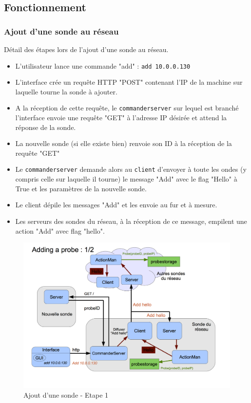 \documentclass[a4paper,11pt]{article}
\begin{document}
\FloatBarrier


\subsection{Fonctionnement}

\subsubsection{Ajout d'une sonde au réseau}

Détail des étapes lors de l'ajout d'une sonde au réseau.
\begin{itemize}
\item L'utilisateur lance une commande "add" : \texttt{add 10.0.0.130}
\item L'interface crée un requête HTTP "POST" contenant l'IP de la machine sur laquelle tourne la sonde à ajouter.
\item A la réception de cette requête, le \texttt{commanderserver} sur lequel est branché l'interface envoie une requête "GET" à l'adresse IP désirée et attend la réponse de la sonde.
\item La nouvelle sonde (si elle existe bien) renvoie son ID à la réception de la requête "GET"
\item Le \texttt{commanderserver} demande alors au \texttt{client} d'envoyer à toute les ondes (y compris celle sur laquelle il tourne) le message "Add" avec le flag "Hello" à True et les paramètres de la nouvelle sonde.
\item Le client dépile les messages "Add" et les envoie au fur et à mesure.
\item Les serveurs des sondes du réseau, à la réception de ce message, empilent une action "Add" avec flag "hello".
\end{itemize}

\begin{figure}[!ht]
\centering\includegraphics[width=\linewidth]{img/graphAdd1.png}
\caption{Ajout d'une sonde - Etape 1}
\end{figure}
\end{document}
